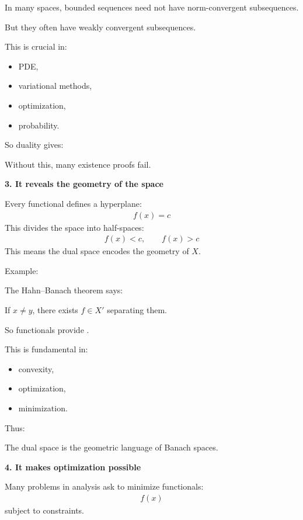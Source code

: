 \documentclass[12pt,a4paper]{report}
\begin{document}
\begin{description}
In many spaces, bounded sequences need not have norm-convergent subsequences.

But they often have weakly convergent subsequences.

This is crucial in:

	\begin{itemize}
    \item PDE,
    \item variational methods,
    \item optimization,
    \item probability.
	\end{itemize}

So duality gives:

\> 

Without this, many existence proofs fail.

\item \textbf{3. It reveals the geometry of the space}

Every functional defines a hyperplane:
\begin{align*}
f(x)=c
\end{align*}
This divides the space into half-spaces:
\begin{align*}
f(x)<c,\qquad f(x)>c
\end{align*}
This means the dual space encodes the geometry of $X$.

    \item Example:

The Hahn–Banach theorem says:

\> If $x\neq y$, there exists $f\in X'$ separating them.

So functionals provide .

This is fundamental in:
	\begin{itemize}
    \item convexity,
    \item optimization,
    \item minimization.
	\end{itemize}

Thus:

\> The dual space is the geometric language of Banach spaces.

\item \textbf{4. It makes optimization possible}

Many problems in analysis ask to minimize functionals:
\begin{align*}
f(x)
\end{align*}
subject to constraints.


\end{description}
\end{document}
